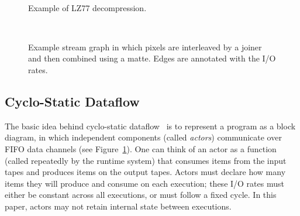 \begin{figure}[t]
\vspace{-\baselineskip}
\begin{minipage}{3in}
\mbox{~}
\begin{center}
\caption{Example of LZ77 decompression.
\protect\label{fig:lz77}}
\end{center}
\end{minipage}
\hspace{0.25in}
\begin{minipage}{2.65in}
\mbox{~}\hspace{0.5in}
\vspace{4pt}
\caption{Example stream graph in which pixels are interleaved by a
  joiner and then combined using a matte.  Edges are annotated with
  the I/O rates.\protect\label{fig:streamit}}
\end{minipage}
\vspace{-\baselineskip}
\end{figure}

\subsection{Cyclo-Static Dataflow}

The basic idea behind cyclo-static
dataflow~\cite{bilsen95-cyclostatic,LM87-i} is to represent a program
as a block diagram, in which independent components (called {\it
  actors}) communicate over FIFO data channels (see
Figure~\ref{fig:streamit}).  One can think of an actor as a function
(called repeatedly by the runtime system) that consumes items from the
input tapes and produces items on the output tapes.  Actors must
declare how many items they will produce and consume on each
execution; these I/O rates must either be constant across all
executions, or must follow a fixed cycle.  In this paper, actors may
not retain internal state between executions.

